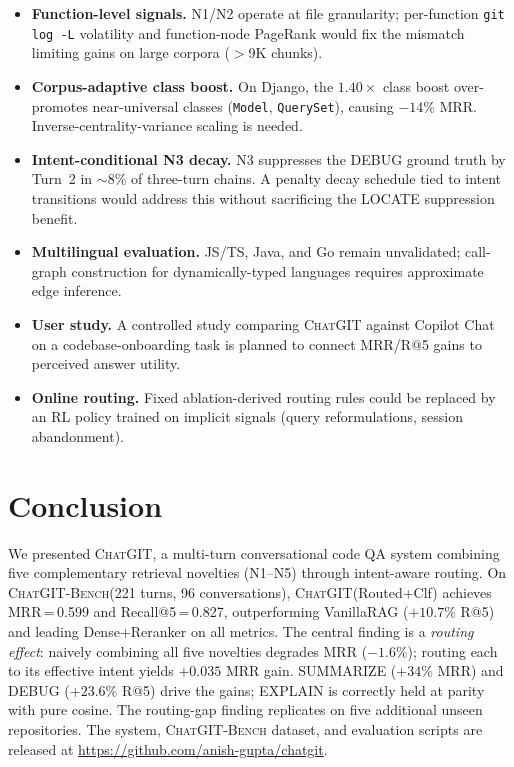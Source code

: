 \documentclass[conference]{IEEEtran}
\newcommand{\chatgit}{\textsc{ChatGIT}\xspace}
\newcommand{\conv}{\textsc{ChatGIT-Bench}\xspace}
\begin{document}
\begin{itemize}
  \item \textbf{Function-level signals.} N1/N2 operate at file
        granularity; per-function \texttt{git log -L} volatility and
        function-node PageRank would fix the mismatch limiting gains
        on large corpora ($>$9K chunks).

  \item \textbf{Corpus-adaptive class boost.} On Django, the
        $1.40\times$ class boost over-promotes near-universal classes
        (\texttt{Model}, \texttt{QuerySet}), causing $-14\%$ MRR.
        Inverse-centrality-variance scaling is needed.

  \item \textbf{Intent-conditional N3 decay.} N3 suppresses the DEBUG
        ground truth by Turn~2 in ${\sim}$8\% of three-turn chains. A
        penalty decay schedule tied to intent transitions would address
        this without sacrificing the LOCATE suppression benefit.

  \item \textbf{Multilingual evaluation.} JS/TS, Java, and Go remain
        unvalidated; call-graph construction for dynamically-typed
        languages requires approximate edge inference.

  \item \textbf{User study.} A controlled study comparing \chatgit
        against Copilot Chat on a codebase-onboarding task is planned
        to connect MRR/R@5 gains to perceived answer utility.

  \item \textbf{Online routing.} Fixed ablation-derived routing rules
        could be replaced by an RL policy trained on implicit signals
        (query reformulations, session abandonment).
\end{itemize}

\section{Conclusion}

We presented \chatgit, a multi-turn conversational code QA system
combining five complementary retrieval novelties (N1--N5) through
intent-aware routing. On \conv (221 turns, 96 conversations),
\chatgit (Routed+Clf) achieves MRR\,=\,0.599 and Recall@5\,=\,0.827,
outperforming VanillaRAG ($+10.7\%$ R@5) and leading Dense+Reranker
on all metrics. The central finding is a \emph{routing effect}:
naively combining all five novelties degrades MRR ($-1.6\%$); routing
each to its effective intent yields $+0.035$ MRR gain. SUMMARIZE
($+34\%$ MRR) and DEBUG ($+23.6\%$ R@5) drive the gains; EXPLAIN
is correctly held at parity with pure cosine. The routing-gap finding
replicates on five additional unseen repositories. The system, \conv
dataset, and evaluation scripts are released at
\url{https://github.com/anish-gupta/chatgit}.
\end{document}
